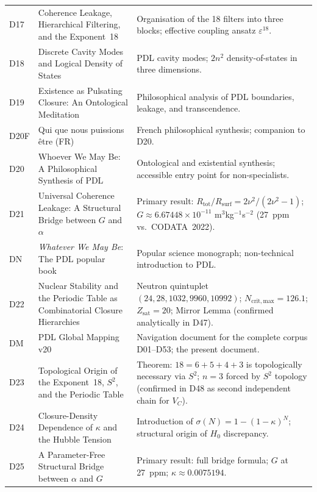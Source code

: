 \documentclass[11pt,a4paper]{article}
\theoremstyle{plain}
\theoremstyle{definition}
\theoremstyle{remark}
\begin{document}
\begin{longtable}{L{1.3cm}L{3.8cm}L{8.0cm}}
D17 & Coherence Leakage, Hierarchical Filtering, and the Exponent~18~\cite{D17} & Organisation of the 18 filters into three blocks; effective coupling ansatz $\varepsilon^{18}$.\\[0.3em]
D18 & Discrete Cavity Modes and Logical Density of States~\cite{D18} & PDL cavity modes; $2n^2$ density-of-states in three dimensions.\\[0.3em]
D19 & Existence as Pulsating Closure: An Ontological Meditation~\cite{D19} & Philosophical analysis of PDL boundaries, leakage, and transcendence.\\[0.3em]
D20F & Qui que nous puissions \^etre (FR)~\cite{D20F} & French philosophical synthesis; companion to D20.\\[0.3em]
D20 & Whoever We May Be: A Philosophical Synthesis of PDL~\cite{D20} & Ontological and existential synthesis; accessible entry point for non-specialists.\\[0.3em]
D21 & Universal Coherence Leakage: A Structural Bridge between $G$ and $\alpha$~\cite{D21} & \textcolor{proofblue}{Primary result}: $R_{\mathrm{tot}}/R_{\mathrm{surf}} = 2\nu^2/(2\nu^2-1)$; $G \approx 6.67448\times 10^{-11}$ m$^3$kg$^{-1}$s$^{-2}$ (27~ppm vs.\ CODATA~2022).\\[0.3em]
DN & \emph{Whatever We May Be}: The PDL popular book~\cite{DN} & Popular science monograph; non-technical introduction to PDL.\\[0.3em]
D22 & Nuclear Stability and the Periodic Table as Combinatorial Closure Hierarchies~\cite{D22} & Neutron quintuplet $(24,28,1032,9960,10992)$; $N_{\mathrm{crit,max}}=126.1$; $Z_{\mathrm{sat}}=20$; Mirror Lemma (confirmed analytically in D47).\\[0.3em]
DM & PDL Global Mapping v20~\cite{DMapv10} & Navigation document for the complete corpus D01--D53; the present document.\\[0.3em]
D23 & Topological Origin of the Exponent~18, $S^2$, and the Periodic Table~\cite{D23} & \textcolor{proofblue}{Theorem}: $18=6+5+4+3$ is topologically necessary via $S^2$; $n=3$ forced by $S^2$ topology (confirmed in D48 as second independent chain for $V_C$).\\[0.3em]
D24 & Closure-Density Dependence of $\kappa$ and the Hubble Tension~\cite{D24} & Introduction of $\sigma(N)=1-(1-\kappa)^N$; structural origin of $H_0$ discrepancy.\\[0.3em]
D25 & A Parameter-Free Structural Bridge between $\alpha$ and $G$~\cite{D25} & \textcolor{proofblue}{Primary result}: full bridge formula; $G$ at 27~ppm; $\kappa\approx 0.0075194$.\\[0.3em]

\end{longtable}
\end{document}
